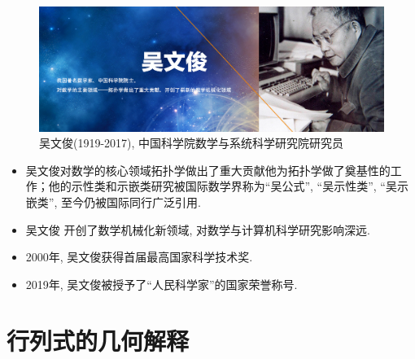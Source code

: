 \documentclass[10pt,punct]{ctexbeamer}
\begin{document}
\begin{frame}

        \begin{figure}[p]
            \includegraphics[scale=0.3]{wu.jpeg}
            \caption{吴文俊(1919-2017), 中国科学院数学与系统科学研究院研究员}
        \end{figure}
    \small{
\begin{itemize}
\item 吴文俊对数学的核心领域拓扑学做出了重大贡献他为拓扑学做了奠基性的工作；他的示性类和示嵌类研究被国际数学界称为“吴公式”, “吴示性类”, “吴示嵌类”, 至今仍被国际同行广泛引用.

\item 吴文俊 开创了数学机械化新领域, 对数学与计算机科学研究影响深远.


\item 2000年, 吴文俊获得首届最高国家科学技术奖.

\item 2019年, 吴文俊被授予了“人民科学家”的国家荣誉称号.

\end{itemize}}
\end{frame}


\section{行列式的几何解释}
\end{document}

